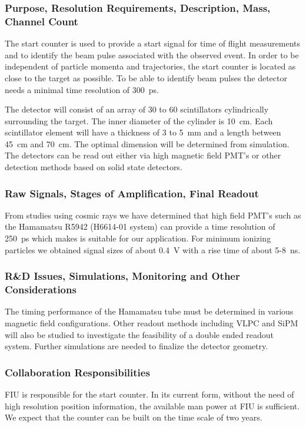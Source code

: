 \subsubsection*{Purpose, Resolution Requirements, Description, Mass, Channel Count}
The start counter is used to provide a start signal for
time of flight measurements and to identify  the beam pulse associated
with the observed event. In order to be independent of particle momenta
and trajectories, the start counter is located as close to the target as
possible. To be able to identify beam pulses the detector
needs a minimal time resolution of 300~ps. 

The detector will consist of an array of 30 to 60 scintillators
cylindrically surrounding the target. The inner diameter of the
cylinder is 10~cm. Each scintillator element will have  
a thickness of 3 to 5~mm and a length between 45~cm and
70~cm. The optimal dimension will be determined from simulation. The
detectors can be read out either via high magnetic field PMT's or
other detection methods based on solid state detectors.     

\subsubsection*{Raw Signals, Stages of Amplification, Final Readout}
From studies using cosmic rays we have determined that high field
PMT's such as the Hamamatsu R5942 (H6614-01 system) can provide a time
resolution of 250~ps which makes is suitable for our application. For
minimum ionizing particles we obtained signal sizes of about 0.4~V
with a rise time of about 5-8~ns.

\subsubsection*{R\&D Issues, Simulations, Monitoring and Other Considerations}
The timing performance of the Hamamatsu tube must be determined in
various magnetic field configurations. Other readout methods including
VLPC and SiPM will also be studied to investigate the feasibility of a
double ended readout system. Further simulations are needed to finalize
the detector geometry.

\subsubsection*{Collaboration Responsibilities}
FIU is responsible for the start counter. In its current form, without
the need of high resolution position information, the available man
power at FIU is sufficient.
We expect that the counter can be built on the time scale of two years.



